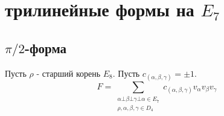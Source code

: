 \documentclass[a4paper,12pt]{amsart}
\theoremstyle{plain}
\newtheorem{lemma}{Лемма}
\theoremstyle{remark}
\theoremstyle{definition}
\begin{document}
\begin{comment}
\begin{lemma}
Пусть $\alpha \bot \beta \in E7$, тогда $\alpha \in s(\rho, \beta) \Leftrightarrow \beta \in s(\rho, \alpha)$
\end{lemma}
\begin{proof}
Достаточно доказать только в одну сторону (потому что все симметрично).
\end{proof}

Теперь мы все подготовили, чтобы доказать главную лемму (которая доказывает соответствие корней в форме).
\begin{lemma}
Пусть $\beta \bot \gamma \in s(\rho,\alpha)|_{E7}$. Тогда $\gamma, \alpha \in s(\rho,\beta)|_{E7}$ и $\alpha, \beta \in s(\rho,\gamma)|_{E7}$
\end{lemma}
\begin{proof}
\end{proof}
\end{comment}

\section{трилинейные формы на $E_7$}

\subsection{$\pi/2$-форма}

Пусть $\rho$ - старший корень $E_8$. Пусть $c_{(\alpha,\beta,\gamma)}=\pm1$.
$$F=\sum_{\substack{\alpha\bot\beta\bot\gamma\bot\alpha\in E_7 \\ {\rho,\alpha,\beta,\gamma}\in D_4}}c_{(\alpha,\beta,\gamma)}v_{\alpha}v_{\beta}v_{\gamma}$$
\end{document}
